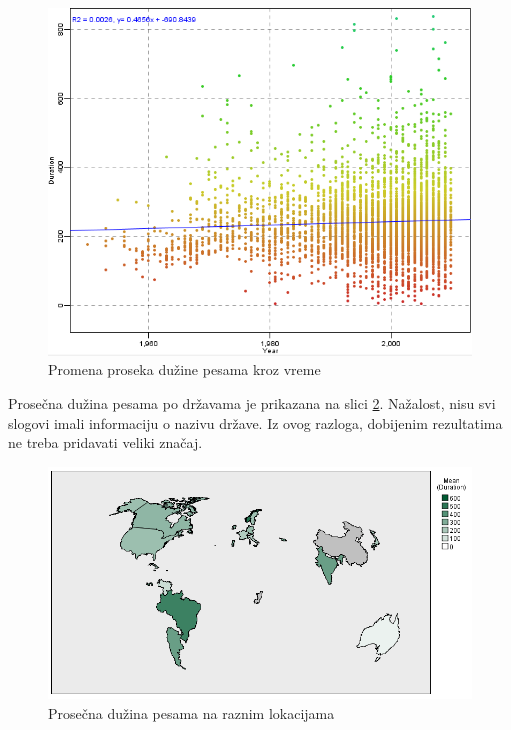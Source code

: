 \begin{figure}[H]
    \centering
    \includegraphics[scale=0.5]{resources/mean-year-duration.PNG}
    \caption{Promena proseka du\v{z}ine pesama kroz vreme}
    \label{fig:YearDurationAvg}
\end{figure}


Prose\v{c}na du\v{z}ina pesama po dr\v{z}avama je prikazana na slici \ref{fig:CountryDuration}. Na\v{z}alost, nisu svi slogovi imali informaciju o nazivu dr\v{z}ave. Iz ovog razloga, dobijenim rezultatima ne treba pridavati veliki zna\v{c}aj.

\begin{figure}[H]
    \centering
    \includegraphics[scale=0.45]{resources/country-duration.png}
    \caption{Prose\v{c}na du\v{z}ina pesama na raznim lokacijama}
    \label{fig:CountryDuration}
\end{figure}


